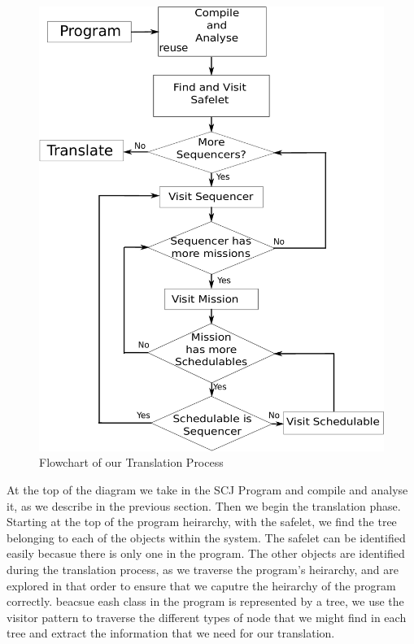 \documentclass[10pt,a4paper]{article}
\begin{document}
\begin{figure}
\includegraphics[scale=0.5]{translation.pdf}
\caption{Flowchart of our Translation Process \label{fig:translationFlow} }
\end{figure}

At the top of the diagram we take in the SCJ Program and compile and analyse it, as we describe in the previous section. Then we begin the translation phase. Starting at the top of the program heirarchy, with the safelet, we find the tree belonging to each of the objects within the system. The safelet can be identified easily becasue there is only one in the program. The other objects are identified during the translation process, as we traverse the program's heirarchy, and are explored in that order to ensure that we caputre the heirarchy of the program correctly. beacsue eash class in the program is represented by a tree, we use the visitor pattern to traverse the different types of node that we might find in each tree and extract the information that we need for our translation.
\end{document}
